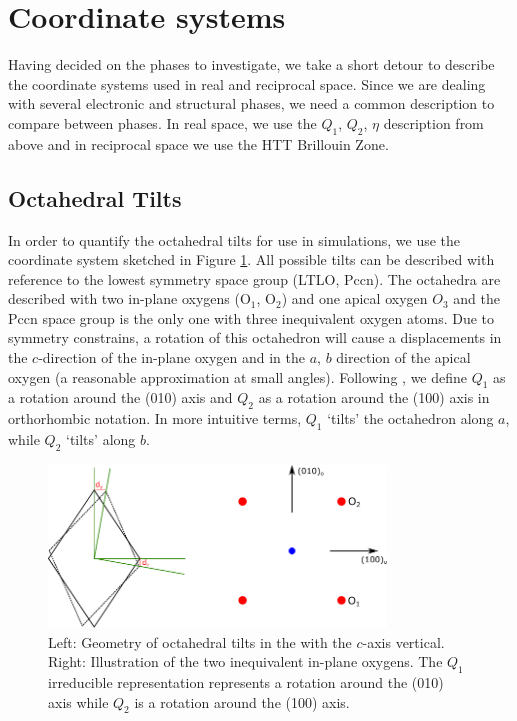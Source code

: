 \section{Coordinate systems}
Having decided on the phases to investigate, we take a short detour to describe the coordinate systems used in real and reciprocal space. Since we are dealing with several electronic and structural phases, we need a common description to compare between phases. In real space, we use the $Q_1$, $Q_2$, $\eta$ description from above and in reciprocal space we use the HTT Brillouin Zone.

\subsection{Octahedral Tilts}
In order to quantify the octahedral tilts for use in simulations, we use the coordinate system sketched in Figure \ref{fig:tilt}. All possible tilts can be described with reference to the lowest symmetry space group (LTLO, Pccn). The octahedra are described with two in-plane oxygens (O$_1$, O$_2$) and one apical oxygen $O_3$ and the Pccn space group is the only one with three inequivalent oxygen atoms. Due to symmetry constrains, a rotation of this octahedron will cause a displacements in the $c$-direction of the in-plane oxygen and in the $a$, $b$ direction of the apical oxygen (a reasonable approximation at small angles). Following \cite{Axe1989}, we define $Q_1$ as a rotation around the (010) axis and $Q_2$ as a rotation around the (100) axis in orthorhombic notation. In more intuitive terms, $Q_1$ `tilts' the octahedron along $a$, while $Q_2$ `tilts' along $b$.

\begin{figure}
	\centering
	\includegraphics[width=0.8\textwidth]{fig/simulation/tilt.pdf}
	\caption[Geometry of octahedral tilts]{Left: Geometry of octahedral tilts in the with the $c$-axis vertical. Right: Illustration of the two inequivalent in-plane oxygens. The $Q_1$ irreducible representation represents a rotation around the (010) axis while $Q_2$ is a rotation around the (100) axis.}
	\label{fig:tilt}
\end{figure}

